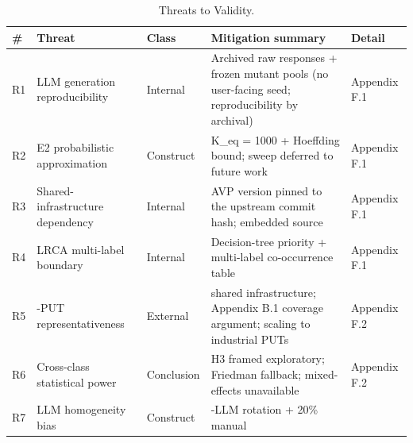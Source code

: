 \documentclass[acmsmall,screen,review]{acmart}
\begin{document}
{\def\LTcaptype{table} %
\begin{longtable}[]{@{}
  >{\raggedright\arraybackslash}p{}
  >{\raggedright\arraybackslash}p{}
  >{\raggedright\arraybackslash}p{}
  >{\raggedright\arraybackslash}p{}
  >{\raggedright\arraybackslash}p{}@{}}
\caption{Threats to Validity.}\label{tab:p2-14}\\
\toprule\noalign{}
\begin{minipage}[b]{\linewidth}\raggedright
\#
\end{minipage} & \begin{minipage}[b]{\linewidth}\raggedright
Threat
\end{minipage} & \begin{minipage}[b]{\linewidth}\raggedright
Class
\end{minipage} & \begin{minipage}[b]{\linewidth}\raggedright
Mitigation summary
\end{minipage} & \begin{minipage}[b]{\linewidth}\raggedright
Detail
\end{minipage} \\
\midrule\noalign{}
\endfirsthead
\endhead
\bottomrule\noalign{}
\endlastfoot
R1 & LLM generation reproducibility & Internal & Archived raw responses
+ frozen mutant pools (no user-facing seed; reproducibility by archival) & Appendix F.1 \\
R2 & E2 probabilistic approximation & Construct & K\_eq = 1000 +
Hoeffding bound; sweep deferred to future work & Appendix F.1 \\
R3 & Shared-infrastructure dependency & Internal & AVP version pinned to the upstream
commit hash; embedded source & Appendix F.1 \\
R4 & LRCA multi-label boundary & Internal & Decision-tree priority +
multi-label co-occurrence table & Appendix F.1 \\
R5 & 12-PUT representativeness & External & shared infrastructure; Appendix B.1
coverage argument; scaling to industrial PUTs & Appendix F.2 \\
R6 & Cross-class statistical power & Conclusion & H3 framed exploratory;
Friedman fallback; mixed-effects unavailable & Appendix F.2 \\
R7 & LLM homogeneity bias & Construct & 3-LLM rotation + 20\% manual

\end{longtable}}
\end{document}
